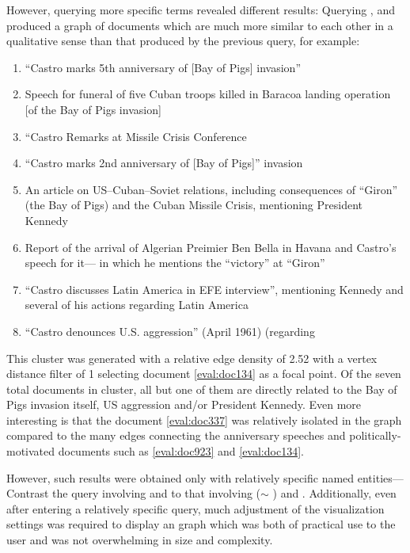 However, querying more specific terms revealed different results: Querying , and  produced a graph of documents which are much more similar to each other in a qualitative sense than that produced by the previous query, for example:

\begin{enumerate}
\item ``Castro marks 5th anniversary of [Bay of Pigs] invasion'' \label{eval:doc274}
\item Speech for funeral of five Cuban troops killed in Baracoa landing operation [of the Bay of Pigs invasion]\label{eval:doc337}
\item ``Castro Remarks at Missile Crisis Conference\label{eval:doc1418}
\item ``Castro marks 2nd anniversary of [Bay of Pigs]'' invasion \label{eval:doc210}
\item An article on US--Cuban--Soviet relations, including consequences of ``Giron'' (the Bay of Pigs) and the Cuban Missile Crisis, mentioning President Kennedy\label{eval:doc864}
\item Report of the arrival of Algerian Preimier Ben Bella in Havana and Castro's speech for it--- in which he mentions the ``victory'' at ``Giron''
\item ``Castro discusses Latin America in EFE interview'', mentioning Kennedy and several of his actions regarding Latin America \label{eval:doc923}
\item ``Castro denounces U.S. aggression'' (April 1961) \label{eval:doc134} (regarding 
\end{enumerate} 

This cluster was generated with a relative edge density of 2.52 with a vertex distance filter of 1 selecting document \ref{eval:doc134} as a focal point. Of the seven total documents in cluster, all but one of them are directly related to the Bay of Pigs invasion itself, US aggression and/or President Kennedy. Even more interesting is that the document \ref{eval:doc337} was relatively isolated in the graph compared to the many edges connecting the anniversary speeches and politically-motivated documents such as \ref{eval:doc923} and \ref{eval:doc134}.

However, such results were obtained only with relatively specific named entities--- Contrast the query involving  and  to that involving  ($\sim$ )  and . Additionally, even after entering a relatively specific query, much adjustment of the visualization settings was required to display an graph which was both of practical use to the user and was not overwhelming in size and complexity.